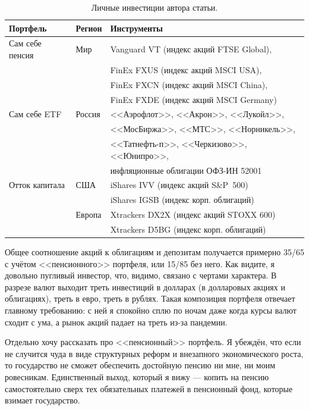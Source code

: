 \begin{table}[h]
\centering
\begin{tabular}{l|l|l}
Портфель        & Регион & Инструменты \\
\hline
Сам себе пенсия & Мир    & Vanguard VT (индекс акций FTSE Global), \\
                &        & FinEx FXUS (индекс акций MSCI USA), \\ 
                &        & FinEx FXCN (индекс акций MSCI China), \\
                &        & FinEx FXDE (индекс акций MSCI Germany) \\
\hline
Сам себе ETF    & Россия & <<Аэрофлот>>, <<Акрон>>, <<Лукойл>>, \\
                &        & <<МосБиржа>>, <<МТС>>, <<Норникель>>,\\
                &        & <<Татнефть-п>>, <<Черкизово>>, <<Юнипро>>, \\
                &        & инфляционные облигации ОФЗ-ИН 52001 \\
\hline
Отток капитала  & США    & iShares IVV (индекс акций S\&P~500) \\
                &        & iShares IGSB (индекс корп. облигаций) \\
\cline{2-3}
                & Европа & Xtrackers DX2X (индекс акций STOXX 600) \\
                &        & Xtrackers D5BG (индекс корп. облигаций)
\end{tabular}
\caption{Личные инвестиции автора статьи.}
\label{personal_portfolios}
\end{table}

Общее соотношение акций к облигациям и депозитам получается примерно 35/65 с 
учётом <<пенсионного>> портфеля, или 15/85 без него. Как видите, я довольно 
пугливый инвестор, что, видимо, связано с чертами характера. В разрезе валют 
выходит треть инвестиций в долларах (в долларовых акциях и облигациях), треть в 
евро, треть в рублях. Такая композиция портфеля отвечает главному требованию: с 
ней я спокойно сплю по ночам даже когда курсы валют сходит с ума, а рынок акций 
падает на треть из-за пандемии.

Отдельно хочу рассказать про <<пенсионный>> портфель. Я убеждён, что если не 
случится чуда в виде структурных реформ и внезапного экономического роста, то 
государство не сможет обеспечить достойную пенсию ни мне, ни моим ровесникам. 
Единственный выход, который я вижу --- копить на пенсию самостоятельно сверх тех 
обязательных платежей в пенсионный фонд, которые взимает государство.

